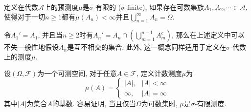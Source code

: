 \documentclass[cn, 12pt, math=mtpro2, bibstyle=apa, blue, twocol]{elegantbook}
\newcommand{\F}{\mathcal{F}}
\begin{document}
\begin{definition}
定义在代数$\mathcal{A}$上的预测度$\mu$是$\sigma$-有限的 ($\sigma$-finite), 如果存在可数集族$A_1,A_2,\cdots\in\mathcal{A}$, 使得对于一切$n\geq1$都有$\mu(A_n)<\infty$并且$\bigcup_{n=1}^\infty A_n=\Omega$.

\end{definition}
\begin{remark}
令$A_1'=A_1$, 并且当$n\ge2$时有$A_n'=A_n\cap (\bigcup_{m=1}^{n-1}A_m^c)$, 那么在上述定义中可以不失一般性地假设$A_n$是互不相交的集合. 此外, 这一概念同样适用于定义在$\sigma$-代数上的测度$\mu$.
\end{remark}
\begin{example}[计数测度]
设$(\Omega,\F)$为一个可测空间, 对于任意$A\in\F$, 定义计数测度$\mu$为
$$\mu(A)=\begin{cases}
           |A|, & |A|<\infty \\
           \infty, & |A|=\infty
         \end{cases}$$
其中$|A|$为集合$A$的基数. 容易证明, 当且仅当$\Omega$为可数集时, $\mu$是$\sigma$-有限测度.
\end{example}
\end{document}
